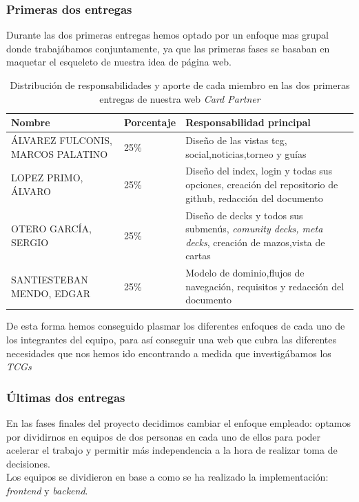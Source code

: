 \documentclass[10pt]{article}
\begin{document}
	\subsubsection{Primeras dos entregas}
	Durante las dos primeras entregas hemos optado por un enfoque mas grupal donde trabajábamos conjuntamente, ya que las primeras fases se basaban en maquetar el esqueleto de nuestra idea de página web.
	\begin{table}[H]
		\centering
		\begin{tabularx}{\textwidth}{llX} 
			\toprule
			\textbf{Nombre} & \textbf{Porcentaje} & \textbf{Responsabilidad principal} \\
			\midrule
			ÁLVAREZ FULCONIS, MARCOS PALATINO      	& 25\%                & Diseño de las vistas tcg, social,noticias,torneo y guías\\
			LOPEZ PRIMO, ÁLVARO      				& 25\%                & Diseño del index, login y todas sus opciones, creación del repositorio de github, redacción del documento\\
			OTERO GARCÍA, SERGIO     				& 25\%                & Diseño de decks y todos sus submenús, \textit{comunity decks, meta decks}, creación de mazos,vista de cartas\\
			SANTIESTEBAN MENDO, EDGAR    			& 25\%                & Modelo de dominio,flujos de navegación, requisitos y redacción del documento\\
			\bottomrule
		\end{tabularx}
		\caption{Distribución de responsabilidades y aporte de cada miembro en las dos primeras entregas de nuestra web \textit{Card Partner}}
	\end{table}
	De esta forma hemos conseguido plasmar los diferentes enfoques de cada uno de los integrantes del equipo, para así conseguir una web que cubra las diferentes necesidades que nos hemos ido encontrando a medida que investigábamos los \textit{TCGs}
	\subsubsection{Últimas dos entregas}
	En las fases finales del proyecto decidimos cambiar el enfoque empleado: optamos por dividirnos en equipos de dos personas en cada uno de ellos para poder acelerar el trabajo y permitir más independencia a la hora de realizar toma de decisiones.\\
	Los equipos se dividieron en base a como se ha realizado la implementación: \textit{frontend} y \textit{backend}.\\
	
\end{document}
